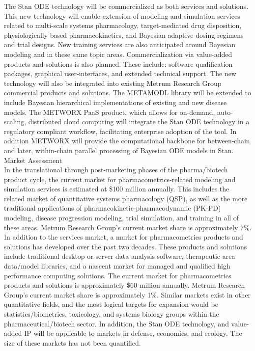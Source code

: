 \noindent
The Stan ODE technology will be commercialized as both services and
solutions. This new technology will enable extension of modeling and
simulation services related to multi-scale systems pharmacology,
target-mediated drug disposition, physiologically based
pharmacokinetics, and Bayesian adaptive dosing regimens and trial
designs. New training services are also anticipated around Bayesian
modeling and in these same topic areas. Commercialization via
value-added products and solutions is also planned. These include:
software qualification packages, graphical user-interfaces, and
extended technical support. The new technology will also be integrated
into existing Metrum Research Group commercial products and
solutions. The METAMODL library will be extended to include Bayesian
hierarchical implementations of existing and new disease models. The
METWORX PaaS product, which allows for on-demand, auto-scaling,
distributed cloud computing will integrate the Stan ODE technology in
a regulatory compliant workflow, facilitating enterprise adoption of
the tool. In addition METWORX will provide the computational backbone
for between-chain and later, within-chain parallel processing of
Bayesian ODE models in Stan.\\ 

\noindent
{\sc Market Assessment}
\\[2pt]
In the translational through post-marketing phases of the
pharma/biotech product cycle, the current market for
pharmacometrics-related modeling and simulation services is estimated
at \$100 million annually. This includes the related market of
quantitative systems pharmacology (QSP), as well as the more
traditional applications of pharmacokinetic-pharmacodynamic (PK-PD)
modeling, disease progression modeling, trial simulation, and training
in all of these areas. Metrum Research Group's current market share is
approximately 7\%. In addition to the services market, a market for
pharmacometrics products and solutions has developed over the past two
decades. These products and solutions include traditional desktop or
server data analysis software, therapeutic area data/model libraries,
and a nascent market for managed and qualified high performance
computing solutions.  The current market for pharmacometrics products
and solutions is approximately \$60 million annually. Metrum Research
Group's current market share is approximately 1\%. Similar markets
exist in other quantitative fields, and the most logical targets for
expansion would be statistics/biometrics, toxicology, and systems
biology groups within the pharmaceutical/biotech sector. In addition,
the Stan ODE technology, and value-added IP will be applicable to
markets in defense, economics, and ecology. The size of these markets
has not been quantified. \\ 

